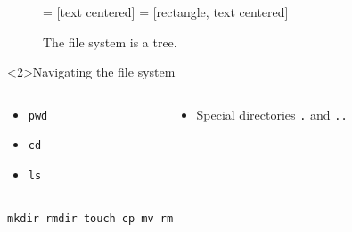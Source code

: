 \begin{frame}
  \begin{figure}
     = [text centered]
     = [rectangle, text centered]
    \caption{The file system is a tree.}
  \end{figure}

  \begin{block}<2>{Navigating the file system}
    \begin{columns}[T]
      \begin{column}{0.5\columnwidth}
        \begin{itemize}
          \item \lstinline{pwd}
          \item \lstinline{cd}
          \item \lstinline{ls}
        \end{itemize}
      \end{column}
      \begin{column}{0.5\columnwidth}
        \begin{itemize}
          \item Special directories \lstinline{.} and \lstinline{..}
        \end{itemize}
      \end{column}
    \end{columns}
  \end{block}
\end{frame}

\begin{frame}[fragile]
  \begin{exercise}
    \begin{center}
      \lstinline[basicstyle=\Large]{mkdir rmdir touch cp mv rm}
    \end{center}
  \end{exercise}
\end{frame}

